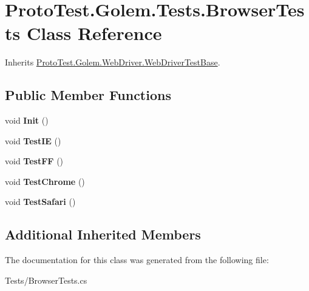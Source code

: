 \hypertarget{class_proto_test_1_1_golem_1_1_tests_1_1_browser_tests}{\section{Proto\-Test.\-Golem.\-Tests.\-Browser\-Tests Class Reference}
\label{class_proto_test_1_1_golem_1_1_tests_1_1_browser_tests}
}


Inherits \hyperlink{class_proto_test_1_1_golem_1_1_web_driver_1_1_web_driver_test_base}{Proto\-Test.\-Golem.\-Web\-Driver.\-Web\-Driver\-Test\-Base}.

\subsection*{Public Member Functions}
\begin{DoxyCompactItemize}
\item 
\hypertarget{class_proto_test_1_1_golem_1_1_tests_1_1_browser_tests_a6a44eebc6185e2f392a2f3aa13626bdc}{void {\bfseries Init} ()}\label{class_proto_test_1_1_golem_1_1_tests_1_1_browser_tests_a6a44eebc6185e2f392a2f3aa13626bdc}

\item 
\hypertarget{class_proto_test_1_1_golem_1_1_tests_1_1_browser_tests_af5d03ac613168b93242184776023ddb2}{void {\bfseries Test\-I\-E} ()}\label{class_proto_test_1_1_golem_1_1_tests_1_1_browser_tests_af5d03ac613168b93242184776023ddb2}

\item 
\hypertarget{class_proto_test_1_1_golem_1_1_tests_1_1_browser_tests_a598adc2367e88e0536e8ddd981ebb364}{void {\bfseries Test\-F\-F} ()}\label{class_proto_test_1_1_golem_1_1_tests_1_1_browser_tests_a598adc2367e88e0536e8ddd981ebb364}

\item 
\hypertarget{class_proto_test_1_1_golem_1_1_tests_1_1_browser_tests_a06bc72f4b1c7c3bdc9a54b67cba1ab09}{void {\bfseries Test\-Chrome} ()}\label{class_proto_test_1_1_golem_1_1_tests_1_1_browser_tests_a06bc72f4b1c7c3bdc9a54b67cba1ab09}

\item 
\hypertarget{class_proto_test_1_1_golem_1_1_tests_1_1_browser_tests_a1271b4cbfee359ded3691c90d9f650d7}{void {\bfseries Test\-Safari} ()}\label{class_proto_test_1_1_golem_1_1_tests_1_1_browser_tests_a1271b4cbfee359ded3691c90d9f650d7}

\end{DoxyCompactItemize}
\subsection*{Additional Inherited Members}


The documentation for this class was generated from the following file\-:\begin{DoxyCompactItemize}
\item 
Tests/Browser\-Tests.\-cs\end{DoxyCompactItemize}
